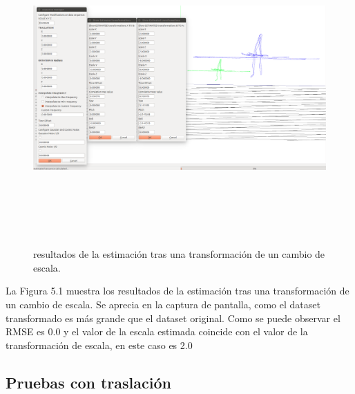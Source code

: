 \begin{figure}[h]
\label{fig:escalaTest}\includegraphics[height=12.0cm,width=18.0cm]{img/cap6/Escala_abba.png}
\hspace{0.5cm}


\caption{resultados de la estimación tras una transformación de un cambio de escala.}
\end{figure}

La Figura 5.1 muestra los resultados de la estimación tras una transformación de un cambio de escala. Se aprecia en la captura de pantalla, como el dataset transformado es más grande que el dataset original. Como se puede observar el RMSE es 0.0 y el valor de la escala estimada coincide con el valor de la transformación de escala, en este caso es 2.0

\subsection{Pruebas con traslación}

